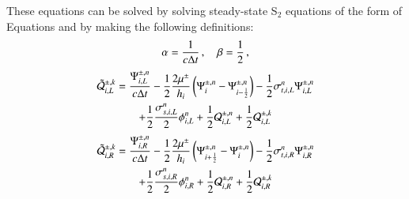These equations can be solved by solving steady-state S$_2$ equations
of the form of Equations  and  by making
the following definitions:
\begin{equation}
  \alpha = \frac{1}{c\Delta t} \, , \quad \beta = \frac{1}{2}\, ,
\end{equation}
\begin{multline}
  \tilde{\mathcal{Q}}_{i,L}^{\pm,k}
  = \frac{\Psi_{i,L}^{\pm,n}}{c\Delta t}
  - \frac{1}{2}\frac{2\mu^\pm}{h_i}\left( \Psi_i^{\pm,n} - \Psi_{i-\frac{1}{2}}^{\pm,n} \right)
  - \frac{1}{2}\sigma_{t,i,L}^n\Psi_{i,L}^{\pm,n}\\
  + \frac{1}{2}\frac{\sigma_{s,i,L}^n}{2}\phi_{i,L}^n
  + \frac{1}{2}\mathcal{Q}_{i,L}^{\pm,n}
  + \frac{1}{2}\mathcal{Q}_{i,L}^{\pm,k}
\end{multline}
\begin{multline}
  \tilde{\mathcal{Q}}_{i,R}^{\pm,k}
  = \frac{\Psi_{i,R}^{\pm,n}}{c\Delta t}
  - \frac{1}{2}\frac{2\mu^\pm}{h_i}\left( \Psi_{i+\frac{1}{2}}^{\pm,n} - \Psi_i^{\pm,n} \right)
  - \frac{1}{2}\sigma_{t,i,R}^n\Psi_{i,R}^{\pm,n}\\
  + \frac{1}{2}\frac{\sigma_{s,i,R}^n}{2}\phi_{i,R}^n
  + \frac{1}{2}\mathcal{Q}_{i,R}^{\pm,n}
  + \frac{1}{2}\mathcal{Q}_{i,R}^{\pm,k}
\end{multline}

